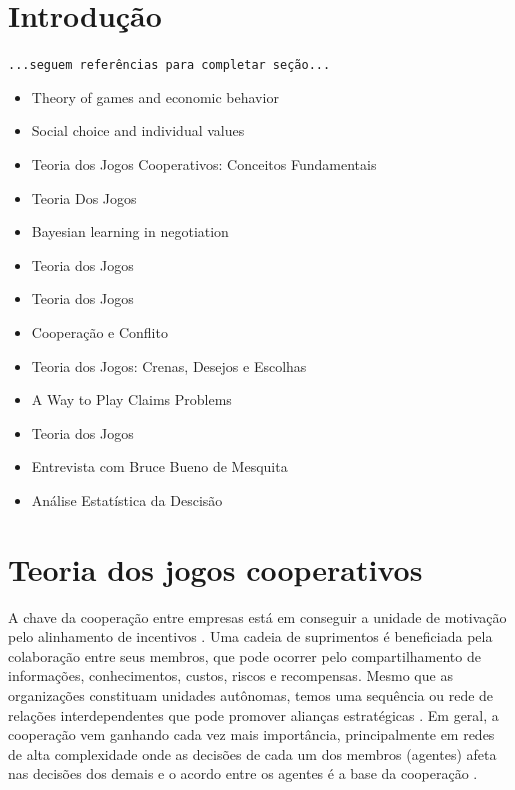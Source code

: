 \documentclass[
	article,			        %
	11pt,				          %
	oneside,			        %
	a4paper,			        %
	english,			        %
	brazil,				        %
	sumario=tradicional
]{abntex2}\usepackage[]{graphicx}\usepackage[]{color}
\begin{document}
\section*{Introdução}

  \texttt{\color{red}...seguem refer\^encias para completar seção...}
  \begin{itemize}
    \item Theory of games and economic behavior \cite{Neumann.1947}
    \item Social choice and individual values \cite{Figueiredo.1994}
    \item Teoria dos Jogos Cooperativos: Conceitos Fundamentais \cite{Moreira.2002}
    \item Teoria Dos Jogos \cite{Fiani.2006}
    \item Bayesian learning in negotiation \cite{Zeng.1998}
    \item Teoria dos Jogos \cite{Tavares.2009}
    \item Teoria dos Jogos \cite{Bierman.2010}
    \item Coopera\c{c}{\~a}o e Conflito \cite{Fiani.2011}
    \item Teoria dos Jogos: Crenas, Desejos e Escolhas \cite{Paula.2014}
    \item A Way to Play Claims Problems \cite{Gimenez.2014}
    \item Teoria dos Jogos \cite{Fiani.2015}
    \item Entrevista com Bruce Bueno de Mesquita \cite{Mesquita.2012}
    \item Análise Estatística da Descisão \cite[p.~122--140]{Otto.2009}
  \end{itemize}

\section{Teoria dos jogos cooperativos}

A chave da cooperação entre empresas está em conseguir a unidade de motivação pelo alinhamento de incentivos \cite{Cao.2012}. Uma cadeia de suprimentos é beneficiada pela colaboração entre seus membros, que pode ocorrer pelo compartilhamento de informações, conhecimentos, custos, riscos e recompensas. Mesmo que as organizações constituam unidades autônomas, temos uma sequ\^encia ou rede de relações interdependentes que pode promover alianças estratégicas \cite{Chen.2004}. Em geral, a cooperação vem ganhando cada vez mais importância, principalmente em redes de alta complexidade \cite{Drechsel.2010} onde as decisões de cada um dos membros (agentes) afeta nas decisões dos demais e o acordo entre os agentes é a base da cooperação \cite{Young.1994}.
\end{document}
